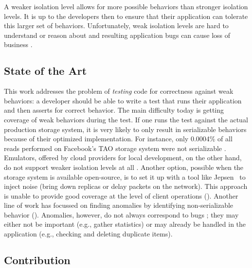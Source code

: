 A weaker isolation level allows for more possible behaviors than stronger
isolation levels. It is up to the developers then to ensure that their
application can tolerate this larger set of behaviors. Unfortunately, weak
isolation levels are hard to understand or reason about
\cite{DBLP:conf/popl/BrutschyD0V17,adya-thesis} and resulting application bugs
can cause loss of business \cite{DBLP:conf/sigmod/WarszawskiB17}.


\subsection{State of the Art}

This work addresses the problem of \textit{testing} code for correctness
against weak behaviors: a developer should be able to write a test that runs
their application and then asserts for correct behavior. 
The main difficulty today is getting coverage of weak behaviors during
the test. If one runs the test
against the actual production storage system, it is very likely to only result in
serializable behaviors because of their optimized implementation. For
instance, only 0.0004\% of all reads performed on Facebook's TAO storage system 
were not serializable \cite{DBLP:conf/sosp/LuVAHSTKL15}. 
Emulators, offered by cloud providers for local development, on the other hand, do not support weaker
isolation levels at all \cite{cosmosdb-local}. Another option, possible when
the storage system is available open-source, is to set it up with a 
tool like Jepsen~\cite{jepsen} to inject noise (bring down replicas or
delay packets on the network). 
This approach is unable to provide good coverage at the level of client operations
\cite{DBLP:journals/pacmpl/RahmaniNDJ19} (). Another line of work has focussed on finding
anomalies by identifying non-serializable behavior (). Anomalies, however, do not
always correspond to bugs \cite{DBLP:conf/pldi/BrutschyD0V18,DBLP:journals/pvldb/GanRRB020}; they may
either not be important (e.g., gather statistics) or may already be handled in
the application (e.g., checking and deleting duplicate items).

\subsection{Contribution}




